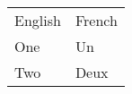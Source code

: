 \documentclass{article}
\begin{document}
\begin{table}
  \begin{tabular}{ll}
    English & French\\
    One     & Un    \\
    Two     & Deux  \\
  \end{tabular}
\end{table}
\end{document}
